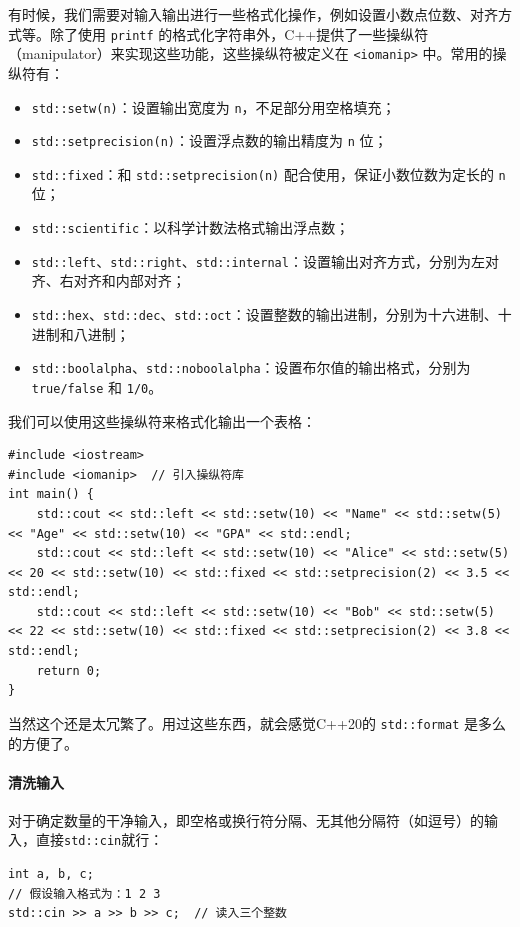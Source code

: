 有时候，我们需要对输入输出进行一些格式化操作，例如设置小数点位数、对齐方式等。除了使用 \verb|printf| 的格式化字符串外，C++提供了一些操纵符（manipulator）来实现这些功能，这些操纵符被定义在 \verb|<iomanip>| 中。常用的操纵符有：
\begin{itemize}
    \item \verb|std::setw(n)|：设置输出宽度为 \verb|n|，不足部分用空格填充；
    \item \verb|std::setprecision(n)|：设置浮点数的输出精度为 \verb|n| 位；
    \item \verb|std::fixed|：和 \verb|std::setprecision(n)| 配合使用，保证小数位数为定长的 \verb|n| 位；
    \item \verb|std::scientific|：以科学计数法格式输出浮点数；
    \item \verb|std::left|、\verb|std::right|、\verb|std::internal|：设置输出对齐方式，分别为左对齐、右对齐和内部对齐；
    \item \verb|std::hex|、\verb|std::dec|、\verb|std::oct|：设置整数的输出进制，分别为十六进制、十进制和八进制；
    \item \verb|std::boolalpha|、\verb|std::noboolalpha|：设置布尔值的输出格式，分别为 \verb|true/false| 和 \verb|1/0|。
\end{itemize}

我们可以使用这些操纵符来格式化输出一个表格：
\begin{verbatim}
#include <iostream>
#include <iomanip>  // 引入操纵符库
int main() {
    std::cout << std::left << std::setw(10) << "Name" << std::setw(5) << "Age" << std::setw(10) << "GPA" << std::endl;
    std::cout << std::left << std::setw(10) << "Alice" << std::setw(5) << 20 << std::setw(10) << std::fixed << std::setprecision(2) << 3.5 << std::endl;
    std::cout << std::left << std::setw(10) << "Bob" << std::setw(5) << 22 << std::setw(10) << std::fixed << std::setprecision(2) << 3.8 << std::endl;
    return 0;
}
\end{verbatim}
当然这个还是太冗繁了。用过这些东西，就会感觉C++20的 \verb|std::format| 是多么的方便了。

\paragraph{清洗输入}

对于确定数量的干净输入，即空格或换行符分隔、无其他分隔符（如逗号）的输入，直接\verb|std::cin|就行：
\begin{verbatim}
int a, b, c;
// 假设输入格式为：1 2 3
std::cin >> a >> b >> c;  // 读入三个整数
\end{verbatim}

